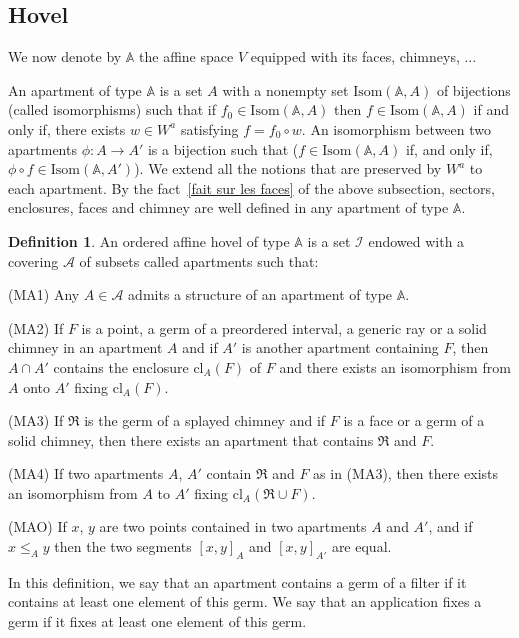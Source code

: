 \documentclass[12pt]{article}
\theoremstyle{plain}
\theoremstyle{definition}
\newtheorem{defn}[thm]{Definition}
\newcommand{\A}{\mathbb{A}}
\begin{document}
\subsection{Hovel}
We now denote by $\A$ the affine space $V$ equipped with its faces, chimneys, ...


An apartment of type $\A$ is a set $A$ with a nonempty set $\mathrm{Isom}(\A,A)$ of bijections (called isomorphisms) such that if $f_0\in \mathrm{Isom}(\A,A)$ then $f\in \mathrm{Isom}(\A,A)$ if and only if, there exists $w\in W^a$ satisfying $f=f_0\circ w$. An isomorphism between two apartments $\phi:A\rightarrow A'$ is a bijection such that ($f\in \mathrm{Isom}(\mathbb{A},A)$ if, and only if, $\phi \circ f\in \mathrm{Isom}(\A,A')$). We extend all the notions that are preserved by $W^a$ to each apartment. By the fact~\ref{fait sur les faces} of the above subsection, sectors, enclosures, faces and chimney are well defined in any apartment of type $\A$.

\begin{defn}
An ordered affine hovel of type $\A$ is a set $\mathcal{I}$ endowed with a covering $\mathcal{A}$ of subsets called apartments such that: 

(MA1) Any $A\in \mathcal{A}$ admits a structure of an apartment of type $\A$.

(MA2) If $F$ is a point, a germ of a preordered interval, a generic ray or a solid chimney in an apartment $A$ and if $A'$ is another apartment containing $F$, then $A\cap A'$ contains the enclosure $\mathrm{cl}_A(F)$ of $F$ and there exists an isomorphism from $A$ onto $A'$ fixing $\mathrm{cl}_A(F)$.

(MA3) If $\mathfrak{R}$ is the germ of a splayed chimney and if $F$ is a face or a germ of a solid chimney, then there exists an apartment that contains $\mathfrak{R}$ and $F$.

(MA4) If two apartments $A$, $A'$ contain $\mathfrak{R}$ and $F$ as in (MA3), then there exists an isomorphism from $A$ to $A'$ fixing $\mathrm{cl}_A(\mathfrak{R}\cup F)$.

(MAO) If $x$, $y$ are two points contained in two apartments $A$ and $A'$, and if $x\leq_{A} y$ then the two segments $[x,y]_A$ and $[x,y]_{A'}$ are equal.
\end{defn}


In this definition, we say that an apartment contains a germ of a filter if it contains at least one element of this germ. We say that an application fixes a germ if it fixes at least one element of this germ.
\end{document}
